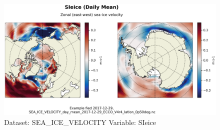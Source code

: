 \begin{figure}[H]
\centering
\includegraphics[scale=0.55]{../images/plots/latlon_plots/Sea-Ice_Velocity/SIeice.png}
\caption{Dataset: SEA\_ICE\_VELOCITY Variable: SIeice}
\label{tab:table-SEA_ICE_VELOCITY_SIeice-Plot}
\end{figure}
\pagebreak
